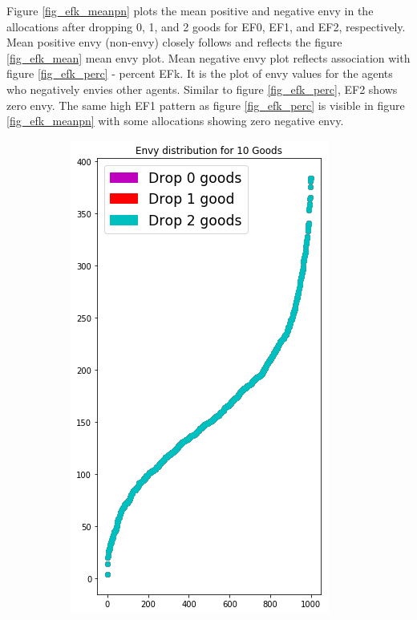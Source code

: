 Figure \ref{fig_efk_meanpn} plots the mean positive and negative envy in the allocations after dropping 0, 1, and 2 goods for EF0, EF1, and EF2, respectively. Mean positive envy (non-envy) closely follows and reflects the figure \ref{fig_efk_mean} mean envy plot. Mean negative envy plot reflects association with figure \ref{fig_efk_perc} - percent EFk. It is the plot of envy values for the agents who negatively envies other agents. Similar to figure \ref{fig_efk_perc}, EF2 shows zero envy. The same high EF1 pattern as figure \ref{fig_efk_perc} is visible in figure \ref{fig_efk_meanpn} with some allocations showing zero negative envy.


\begin{figure}[h!]
  \centering
  \begin{subfigure}[b]{0.47\linewidth}
    \includegraphics[width=\linewidth]{images/envy_density/envy_density_u10.png}

\end{subfigure}
\end{figure}
